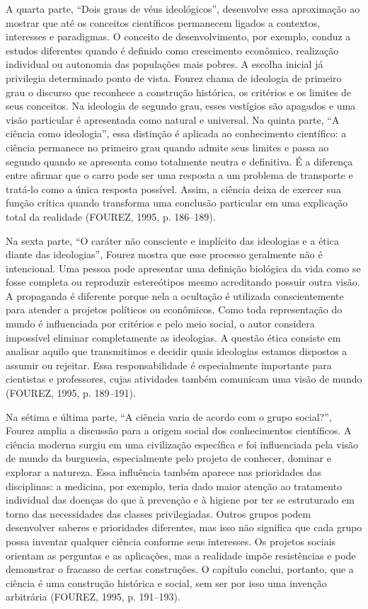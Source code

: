 \documentclass[12pt,a4paper]{article}
\begin{document}
A quarta parte, ``Dois graus de véus ideológicos'', desenvolve essa
aproximação ao mostrar que até os conceitos científicos permanecem ligados
a contextos, interesses e paradigmas. O conceito de desenvolvimento, por
exemplo, conduz a estudos diferentes quando é definido como crescimento
econômico, realização individual ou autonomia das populações mais pobres.
A escolha inicial já privilegia determinado ponto de vista. Fourez chama de
ideologia de primeiro grau o discurso que reconhece a construção histórica,
os critérios e os limites de seus conceitos. Na ideologia de segundo grau,
esses vestígios são apagados e uma visão particular é apresentada como
natural e universal. Na quinta parte, ``A ciência como ideologia'', essa
distinção é aplicada ao conhecimento científico: a ciência permanece no
primeiro grau quando admite seus limites e passa ao segundo quando se
apresenta como totalmente neutra e definitiva. É a diferença entre afirmar
que o carro pode ser uma resposta a um problema de transporte e tratá-lo
como a única resposta possível. Assim, a ciência deixa de exercer sua função
crítica quando transforma uma conclusão particular em uma explicação total
da realidade (FOUREZ, 1995, p. 186--189).

Na sexta parte, ``O caráter não consciente e implícito das ideologias e a
ética diante das ideologias'', Fourez mostra que esse processo geralmente
não é intencional. Uma pessoa pode apresentar uma definição biológica da
vida como se fosse completa ou reproduzir estereótipos mesmo acreditando
possuir outra visão. A propaganda é diferente porque nela a ocultação é
utilizada conscientemente para atender a projetos políticos ou econômicos.
Como toda representação do mundo é influenciada por critérios e pelo meio
social, o autor considera impossível eliminar completamente as ideologias.
A questão ética consiste em analisar aquilo que transmitimos e decidir quais
ideologias estamos dispostos a assumir ou rejeitar. Essa responsabilidade é
especialmente importante para cientistas e professores, cujas atividades
também comunicam uma visão de mundo (FOUREZ, 1995, p. 189--191).

Na sétima e última parte, ``A ciência varia de acordo com o grupo social?'',
Fourez amplia a discussão para a origem social dos conhecimentos
científicos. A ciência moderna surgiu em uma civilização específica e foi
influenciada pela visão de mundo da burguesia, especialmente pelo projeto de
conhecer, dominar e explorar a natureza. Essa influência também aparece nas
prioridades das disciplinas: a medicina, por exemplo, teria dado maior
atenção ao tratamento individual das doenças do que à prevenção e à higiene
por ter se estruturado em torno das necessidades das classes privilegiadas.
Outros grupos podem desenvolver saberes e prioridades diferentes, mas isso
não significa que cada grupo possa inventar qualquer ciência conforme seus
interesses. Os projetos sociais orientam as perguntas e as aplicações, mas a
realidade impõe resistências e pode demonstrar o fracasso de certas
construções. O capítulo conclui, portanto, que a ciência é uma construção
histórica e social, sem ser por isso uma invenção arbitrária (FOUREZ, 1995,
p. 191--193).
\end{document}
